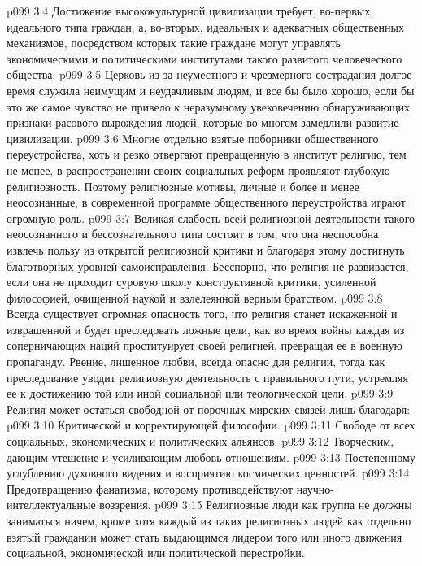 \vs p099 3:4 \pc Достижение высококультурной цивилизации требует, во\hyp{}первых, идеального типа граждан, а, во\hyp{}вторых, идеальных и адекватных общественных механизмов, посредством которых такие граждане могут управлять экономическими и политическими институтами такого развитого человеческого общества.
\vs p099 3:5 Церковь из\hyp{}за неуместного и чрезмерного сострадания долгое время служила неимущим и неудачливым людям, и все бы было хорошо, если бы это же самое чувство не привело к неразумному увековечению обнаруживающих признаки расового вырождения людей, которые во многом замедлили развитие цивилизации.
\vs p099 3:6 Многие отдельно взятые поборники общественного переустройства, хоть и резко отвергают превращенную в институт религию, тем не менее, в распространении своих социальных реформ проявляют глубокую религиозность. Поэтому религиозные мотивы, личные и более и менее неосознанные, в современной программе общественного переустройства играют огромную роль.
\vs p099 3:7 \pc Великая слабость всей религиозной деятельности такого неосознанного и бессознательного типа состоит в том, что она неспособна извлечь пользу из открытой религиозной критики и благодаря этому достигнуть благотворных уровней самоисправления. Бесспорно, что религия не развивается, если она не проходит суровую школу конструктивной критики, усиленной философией, очищенной наукой и взлелеянной верным братством.
\vs p099 3:8 Всегда существует огромная опасность того, что религия станет искаженной и извращенной и будет преследовать ложные цели, как во время войны каждая из соперничающих наций проституирует своей религией, превращая ее в военную пропаганду. Рвение, лишенное любви, всегда опасно для религии, тогда как преследование уводит религиозную деятельность с правильного пути, устремляя ее к достижению той или иной социальной или теологической цели.
\vs p099 3:9 \pc Религия может остаться свободной от порочных мирских связей лишь благодаря:
\vs p099 3:10 \bibnobreakspace Критической и корректирующей философии.
\vs p099 3:11 \bibnobreakspace Свободе от всех социальных, экономических и политических альянсов.
\vs p099 3:12 \bibnobreakspace Творческим, дающим утешение и усиливающим любовь отношениям.
\vs p099 3:13 \bibnobreakspace Постепенному углублению духовного видения и восприятию космических ценностей.
\vs p099 3:14 \bibnobreakspace Предотвращению фанатизма, которому противодействуют научно\hyp{}интеллектуальные воззрения.
\vs p099 3:15 \pc Религиозные люди как группа не должны заниматься ничем, кроме  хотя каждый из таких религиозных людей как отдельно взятый гражданин может стать выдающимся лидером того или иного движения социальной, экономической или политической перестройки.
